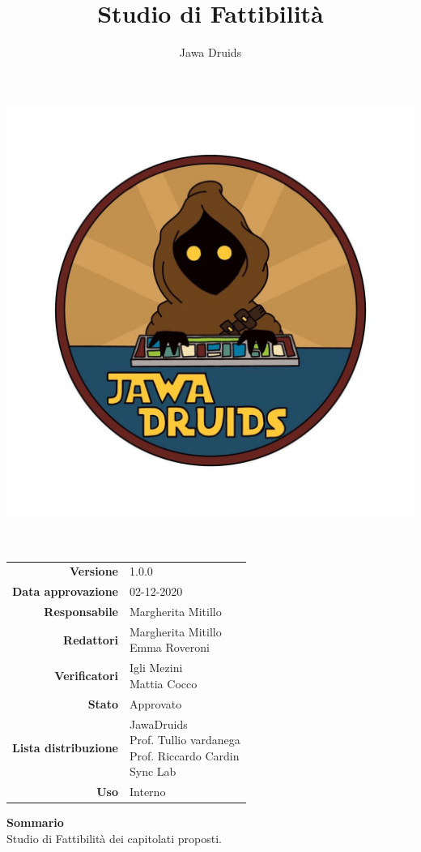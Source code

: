 



	
	\makeatletter
	\begin{titlepage}
		\begin{center}
			\vspace*{-4cm}
			\author{Jawa Druids} 
			\title{Studio di Fattibilità}
			\date{} %
			\includegraphics[width=0.5\linewidth]{../immagini/DRUIDSLOGO.jpg}\\[4ex]
			{\huge \bfseries  \@title }\\[2ex] 
			{\LARGE  \@author}\\[50ex]
			\vspace*{-9cm}
			\begin{table}[H]
				\renewcommand{\arraystretch}{1.4}
				\centering
				\begin{tabular}{r | l}
					\textbf{Versione} & 1.0.0 \\%
					\textbf{Data approvazione} & 02-12-2020\\
					\textbf{Responsabile} & Margherita Mitillo \\
					\textbf{Redattori} & \makecell[tl]{Margherita Mitillo \\ Emma Roveroni} \\
					\textbf{Verificatori} & \makecell[tl]{Igli Mezini \\ Mattia Cocco} \\
					\textbf{Stato} & Approvato\\
					\textbf{Lista distribuzione} & \makecell[tl]{JawaDruids \\ Prof. Tullio vardanega \\ Prof. Riccardo Cardin \\ Sync Lab}\\
					\textbf{Uso} & Interno
				\end{tabular}
			\end{table}
			\vspace{0.1cm}
			\hfill \break
			\fontsize{17}{10}\textbf{Sommario} \\
			\vspace{0.1cm}
			Studio di Fattibilità dei capitolati proposti. 
		\end{center}
	\end{titlepage}
	\makeatother
	
